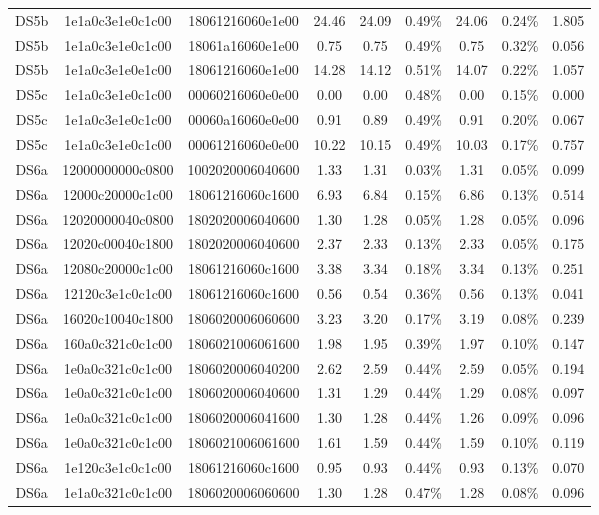 \begin{tabular}{|c|c c|c|c c|c c|c|}
  DS5b & 1e1a0c3e1e0c1c00 & 18061216060e1e00 & 24.46 & 24.09 & 0.49\% & 24.06 & 0.24\% & 1.805 \\
  DS5b & 1e1a0c3e1e0c1c00 & 18061a16060e1e00 & 0.75 & 0.75 & 0.49\% & 0.75 & 0.32\% & 0.056 \\
  DS5b & 1e1a0c3e1e0e1c00 & 18061216060e1e00 & 14.28 & 14.12 & 0.51\% & 14.07 & 0.22\% & 1.057 \\
  DS5c & 1e1a0c3e1e0c1c00 & 00060216060e0e00 & 0.00 & 0.00 & 0.48\% & 0.00 & 0.15\% & 0.000 \\
  DS5c & 1e1a0c3e1e0c1c00 & 00060a16060e0e00 & 0.91 & 0.89 & 0.49\% & 0.91 & 0.20\% & 0.067 \\
  DS5c & 1e1a0c3e1e0c1c00 & 00061216060e0e00 & 10.22 & 10.15 & 0.49\% & 10.03 & 0.17\% & 0.757 \\
  DS6a & 12000000000c0800 & 1002020006040600 & 1.33 & 1.31 & 0.03\% & 1.31 & 0.05\% & 0.099 \\
  DS6a & 12000c20000c1c00 & 18061216060c1600 & 6.93 & 6.84 & 0.15\% & 6.86 & 0.13\% & 0.514 \\
  DS6a & 12020000040c0800 & 1802020006040600 & 1.30 & 1.28 & 0.05\% & 1.28 & 0.05\% & 0.096 \\
  DS6a & 12020c00040c1800 & 1802020006040600 & 2.37 & 2.33 & 0.13\% & 2.33 & 0.05\% & 0.175 \\
  DS6a & 12080c20000c1c00 & 18061216060c1600 & 3.38 & 3.34 & 0.18\% & 3.34 & 0.13\% & 0.251 \\
  DS6a & 12120c3e1c0c1c00 & 18061216060c1600 & 0.56 & 0.54 & 0.36\% & 0.56 & 0.13\% & 0.041 \\
  DS6a & 16020c10040c1800 & 1806020006060600 & 3.23 & 3.20 & 0.17\% & 3.19 & 0.08\% & 0.239 \\
  DS6a & 160a0c321c0c1c00 & 1806021006061600 & 1.98 & 1.95 & 0.39\% & 1.97 & 0.10\% & 0.147 \\
  DS6a & 1e0a0c321c0c1c00 & 1806020006040200 & 2.62 & 2.59 & 0.44\% & 2.59 & 0.05\% & 0.194 \\
  DS6a & 1e0a0c321c0c1c00 & 1806020006040600 & 1.31 & 1.29 & 0.44\% & 1.29 & 0.08\% & 0.097 \\
  DS6a & 1e0a0c321c0c1c00 & 1806020006041600 & 1.30 & 1.28 & 0.44\% & 1.26 & 0.09\% & 0.096 \\
  DS6a & 1e0a0c321c0c1c00 & 1806021006061600 & 1.61 & 1.59 & 0.44\% & 1.59 & 0.10\% & 0.119 \\
  DS6a & 1e120c3e1c0c1c00 & 18061216060c1600 & 0.95 & 0.93 & 0.44\% & 0.93 & 0.13\% & 0.070 \\
  DS6a & 1e1a0c321c0c1c00 & 1806020006060600 & 1.30 & 1.28 & 0.47\% & 1.28 & 0.08\% & 0.096 \\

\end{tabular}
